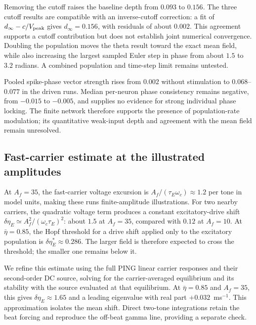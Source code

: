 \documentclass[11pt,a4paper]{article}
\providecommand{\DIFaddtex}[1]{{\protect\color{blue} \sf #1}} %
\providecommand{\DIFadd}[1]{\texorpdfstring{\DIFaddtex{#1}}{#1}} %
\begin{document}
\DIFadd{Removing the cutoff raises the baseline depth from $0.093$ to $0.156$.
The three cutoff results are compatible with an inverse-cutoff correction:
a fit of $d_\infty-c/V_{\rm peak}$ gives $d_\infty=0.156$, with residuals
of about $0.002$. This agreement supports a cutoff contribution but does not
establish joint numerical convergence. Doubling the population moves the
theta result toward the exact mean field, while also increasing the largest
sampled Euler step in phase from about $1.5$ to $3.2$ radians. A combined
population and time-step limit remains untested.
}

\DIFadd{Pooled spike-phase vector strength rises from $0.002$ without stimulation
to $0.068$--$0.077$ in the driven runs. Median per-neuron phase consistency
remains negative, from $-0.015$ to $-0.005$, and supplies no evidence for
strong individual phase locking. The finite network therefore supports the
presence of population-rate modulation; its quantitative weak-input depth
and agreement with the mean field remain unresolved.
}

\fi
\subsection{\DIFadd{Fast-carrier estimate at the illustrated amplitudes}}\label{app:qif-estimate}
\DIFadd{At $A_f=35$, the fast-carrier voltage excursion is
$A_f/(\tau_E\omega_c)\approx1.2$ per tone in model units, making these
runs finite-amplitude illustrations.
For two nearby carriers, the quadratic voltage term produces a constant
excitatory-drive shift $\delta\eta_E\simeq A_f^2/(\omega_c\tau_E)^2$:
about $1.5$ at $A_f=35$, compared with $0.12$ at $A_f=10$.
At $\bar\eta=0.85$, the Hopf threshold for a drive shift applied only to
the excitatory population is $\delta\eta_E^*\approx0.286$.
The larger field is therefore expected to cross the threshold; the smaller
one remains below it.
}

\DIFadd{We refine this estimate using the full PING linear carrier responses and their
second-order DC source, solving for the carrier-averaged equilibrium and its
stability with the source evaluated at that equilibrium. At $\bar\eta=0.85$
and $A_f=35$, this gives $\delta\eta_E\approx1.65$ and a leading eigenvalue
with real part $+0.032$~ms$^{-1}$. This approximation isolates the mean shift.
Direct two-tone integrations retain the beat forcing and reproduce the off-beat
gamma line, providing a separate check.
}
\end{document}
